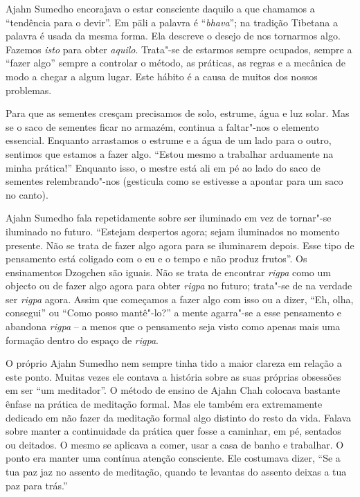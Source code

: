 Ajahn Sumedho encorajava o estar consciente daquilo a que chamamos a
``tendência para o devir''. Em pāli a palavra é ``\emph{bhava}''; na
tradição Tibetana a palavra é usada da mesma forma. Ela descreve o
desejo de nos tornarmos algo. Fazemos \emph{isto} para
obter \emph{aquilo}. Trata"-se de estarmos sempre ocupados, sempre a
``fazer algo'' sempre a controlar o método, as práticas, as regras e a
mecânica de modo a chegar a algum lugar. Este hábito é a causa de muitos
dos nossos problemas.  

Para que as sementes cresçam precisamos de solo, estrume, água e luz
solar. Mas se o saco de sementes ficar no armazém, continua a faltar"-nos
o elemento essencial. Enquanto arrastamos o estrume e a água de um lado
para o outro, sentimos que estamos a fazer algo. ``Estou mesmo a
trabalhar arduamente na minha prática!'' Enquanto isso, o mestre está
ali em pé ao lado do saco de sementes relembrando"-nos (gesticula como se
estivesse a apontar para um saco no canto).

Ajahn Sumedho fala repetidamente sobre ser iluminado em vez de tornar"-se
iluminado no futuro. ``Estejam despertos agora; sejam iluminados no
momento presente. Não se trata de fazer algo agora para se iluminarem
depois. Esse tipo de pensamento está coligado com o eu e o tempo e não
produz frutos''. Os ensinamentos Dzogchen são iguais. Não se trata de
encontrar \emph{rigpa} como um objecto ou de fazer algo agora para
obter \emph{rigpa} no futuro; trata"-se de na verdade ser
\emph{rigpa} agora. Assim que começamos a fazer algo com isso ou a
dizer, ``Eh, olha, consegui'' ou ``Como posso mantê"-lo?'' a mente
agarra"-se a esse pensamento e abandona  \emph{rigpa} -- a menos que o
pensamento seja visto como apenas mais uma formação dentro do espaço
de \emph{rigpa}.

O próprio Ajahn Sumedho nem sempre tinha tido a maior clareza em relação
a este ponto. Muitas vezes ele contava a história sobre as suas próprias
obsessões em ser ``um meditador''. O método de ensino de Ajahn Chah
colocava bastante ênfase na prática de meditação formal. Mas ele também
era extremamente dedicado em não fazer da meditação formal algo distinto
do resto da vida. Falava sobre manter a continuidade da prática quer
fosse a caminhar, em pé, sentados ou deitados. O mesmo se aplicava a
comer, usar a casa de banho e trabalhar. O ponto era manter uma contínua
atenção consciente. \protect\hypertarget{R2}{}{}Ele costumava dizer,
``Se a tua paz jaz no assento de meditação, quando te levantas do
assento deixas a tua paz para trás.''

